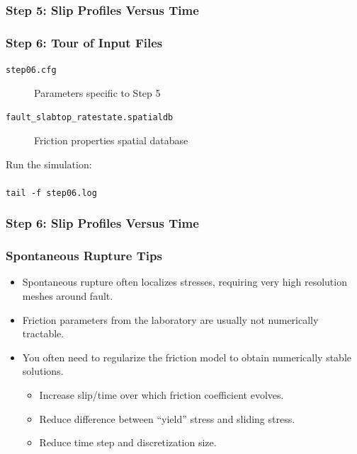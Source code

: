 \documentclass[aspectratio=169]{beamer}
\begin{document}
\begin{frame}
  \frametitle{Step 5: Slip Profiles Versus Time}

  
\end{frame}


\begin{frame}[fragile]
  \frametitle{Step 6: Tour of Input Files}
  \summary{}

  \begin{description}
  \item[{\tt step06.cfg}] Parameters specific to Step 5
  \item[{\tt fault\_slabtop\_ratestate.spatialdb}] Friction properties spatial database
  \end{description}

  \vfill

  Run the simulation:\\
   \\
  {\tt tail -f step06.log}
  
\end{frame}


\begin{frame}
  \frametitle{Step 6: Slip Profiles Versus Time}

  
\end{frame}


\begin{frame}
  \frametitle{Spontaneous Rupture Tips}

  \begin{itemize}
  \item Spontaneous rupture often localizes stresses, requiring very
    high resolution meshes around fault.
  \item Friction parameters from the laboratory are usually not
    numerically tractable.
  \item You often need to regularize the friction model to obtain
    numerically stable solutions.
    \begin{itemize}
    \item Increase slip/time over which friction coefficient
      evolves.
    \item Reduce difference between ``yield'' stress and sliding
      stress.
    \item Reduce time step and discretization size.
    \end{itemize}
  \end{itemize}

  \end{frame}


\end{document}
